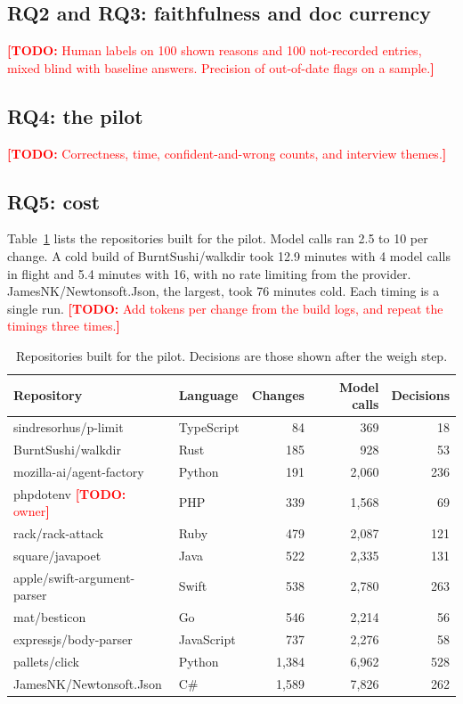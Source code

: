 \documentclass[acmsmall,screen,review]{acmart}
\newcommand{\todo}[1]{\textcolor{red}{\textbf{[TODO:} #1\textbf{]}}}
\begin{document}
\subsection{RQ2 and RQ3: faithfulness and doc currency}
\todo{Human labels on 100 shown reasons and 100 not-recorded entries, mixed blind with baseline answers. Precision of
out-of-date flags on a sample.}

\subsection{RQ4: the pilot}
\todo{Correctness, time, confident-and-wrong counts, and interview themes.}

\subsection{RQ5: cost}
Table~\ref{tab:cost} lists the repositories built for the pilot. Model calls ran 2.5 to 10 per change. A cold build of
BurntSushi/walkdir took 12.9 minutes with 4 model calls in flight and 5.4 minutes with 16, with no rate limiting from
the provider. JamesNK/Newtonsoft.Json, the largest, took 76 minutes cold. Each timing is a single run.
\todo{Add tokens per change from the build logs, and repeat the timings three times.}

\begin{table}[t]
\caption{Repositories built for the pilot. Decisions are those shown after the weigh step.}
\label{tab:cost}
\small
\begin{tabular}{@{}llrrr@{}}
\toprule
Repository & Language & Changes & Model calls & Decisions \\
\midrule
sindresorhus/p-limit & TypeScript & 84 & 369 & 18 \\
BurntSushi/walkdir & Rust & 185 & 928 & 53 \\
mozilla-ai/agent-factory & Python & 191 & 2,060 & 236 \\
phpdotenv \todo{owner} & PHP & 339 & 1,568 & 69 \\
rack/rack-attack & Ruby & 479 & 2,087 & 121 \\
square/javapoet & Java & 522 & 2,335 & 131 \\
apple/swift-argument-parser & Swift & 538 & 2,780 & 263 \\
mat/besticon & Go & 546 & 2,214 & 56 \\
expressjs/body-parser & JavaScript & 737 & 2,276 & 58 \\
pallets/click & Python & 1,384 & 6,962 & 528 \\
JamesNK/Newtonsoft.Json & C\# & 1,589 & 7,826 & 262 \\
\bottomrule
\end{tabular}
\end{table}
\end{document}
